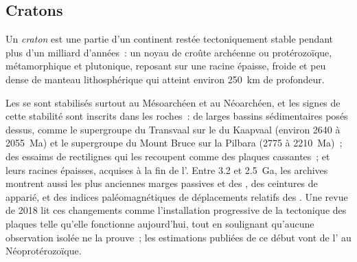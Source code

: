 \subsection*{Cratons}

\begin{definition}[Craton]\label{def:b2:precambrian-earth:craton}
Un \emph{craton} est une partie d'un continent restée tectoniquement stable
pendant plus d'un milliard d'années~: un noyau de croûte archéenne ou protérozoïque, métamorphique et
plutonique, reposant sur une racine épaisse, froide et peu dense de manteau lithosphérique qui atteint environ
\qty{250}{km} de profondeur.
\end{definition}

Les  se sont stabilisés surtout au Mésoarchéen et au Néoarchéen, et les signes de cette
stabilité sont inscrits dans les roches~: de larges bassins sédimentaires posés dessus, comme le
supergroupe du Transvaal sur le  du Kaapvaal (environ 2640 à \qty{2055}{Ma}) et le supergroupe du Mount Bruce
sur la Pilbara (2775 à \qty{2210}{Ma})~; des essaims de  rectilignes qui les recoupent comme des plaques
cassantes~; et leurs racines épaisses, acquises à la fin de l'. Entre 3.2 et
\qty{2.5}{Ga}, les archives montrent aussi les plus anciennes marges passives et des , des ceintures
de  apparié, et des indices paléomagnétiques de déplacements relatifs des .
Une revue de 2018 lit ces changements comme l'installation progressive de la tectonique des plaques telle qu'elle fonctionne
aujourd'hui, tout en soulignant qu'aucune observation isolée ne la prouve~; les estimations publiées de ce
début vont de l' au Néoprotérozoïque.

